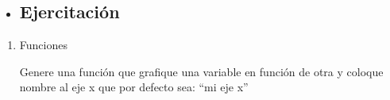 \documentclass[]{book}
\newenvironment{rmdblock}[1]
{\begin{shaded*}
		\begin{itemize}
			\renewcommand{\labelitemi}{
				\raisebox{-.7\height}[0pt][0pt]{
					{\setkeys{Gin}{width=3em,keepaspectratio}\texttt{[image: images/\#1]}}
				}
			}
			\item
		}
		{
		\end{itemize}
	\end{shaded*}
}
\newenvironment{rmdtip}
{\begin{rmdblock}{tip}}
	{\end{rmdblock}}
\begin{document}
\begin{rmdtip}
\hypertarget{ejercitacion}{%
\subsection{Ejercitación}\label{ejercitacion}}
\end{rmdtip}

\begin{boxeda}
\begin{enumerate}
\def\labelenumi{\arabic{enumi}.}
\item
  Funciones

  Genere una función que grafique una variable en función de otra y
  coloque nombre al eje x que por defecto sea: ``mi eje x''
\end{enumerate}
\end{boxeda}


\end{document}
